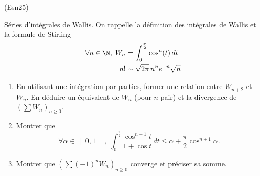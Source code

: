 \begin{tiny}(Esn25)\end{tiny} Séries d'intégrales de Wallis.\newline
On rappelle la définition des intégrales de Wallis et la formule de Stirling
\begin{align*}
 \forall n \in \N, \; W_n &= \int_0^{\frac{\pi}{2}}\cos^n(t)\,dt\\
 n! &\sim \sqrt{2\pi}\, n^n e^{-n} \sqrt{n}
\end{align*}
\begin{enumerate}
 \item En utilisant une intégration par parties, former une relation entre $W_{n+2}$ et $W_n$. En déduire un équivalent de $W_n$ (pour $n$ pair) et la divergence de $(\sum W_n)_{n\geq 0}$.
 \item Montrer que 
\[
 \forall \alpha \in \left] 0,1\right[, \; 
\int_0^{\frac{\pi}{2}}\frac{\cos^{n+1}t}{1+\cos t}\, dt
\leq \alpha + \frac{\pi}{2}\cos^{n+1}\alpha.
\]
\item Montrer que $(\sum (-1)^nW_n)_{n\geq 0}$ converge et préciser sa somme. 
\end{enumerate}